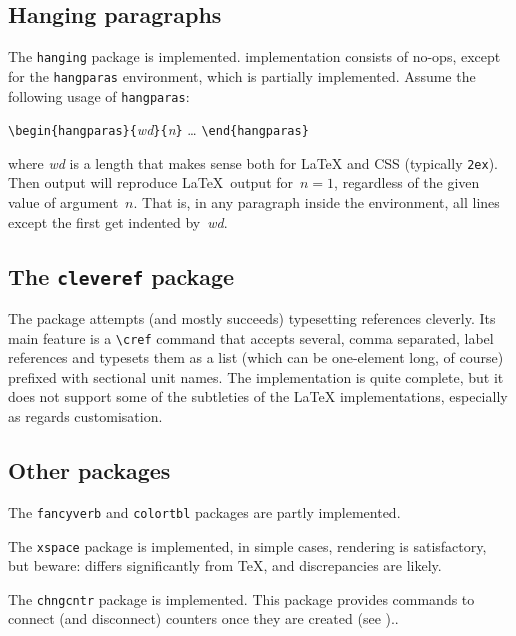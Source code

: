 \subsection{Hanging paragraphs}
%
The \texttt{hanging} package is implemented.
\hevea{} implementation consists of no-ops, except for the
\texttt{hangparas} environment, which is partially implemented.
Assume the following usage of \texttt{hangparas}:
\begin{flushleft}
\verb+\begin{hangparas}{+\textit{wd}\verb+}{+\textit{n}\verb+}+
\quad\ldots
\verb+\end{hangparas}+
\end{flushleft}
where \textit{wd} is a length that makes sense both for \LaTeX{}
and CSS (typically \texttt{2ex}).
Then \html{} output will reproduce \LaTeX~output for~$n=1$, regardless
of the given value of argument~$n$.
That is, in any paragraph inside the environment,
all lines except the first get indented by~\textit{wd}.


\subsection{The \texttt{cleveref} package}
%
The  package
attempts (and mostly succeeds) typesetting references
cleverly. Its main feature is a \verb+\cref+ command that accepts several,
comma separated, label references and typesets them as a list
(which can be one-element long, of course) prefixed with sectional unit names.
The \hevea{} implementation is quite complete, but it does not support some
of the subtleties of the \LaTeX{} implementations, especially as regards
customisation.


\subsection{Other packages}
The \texttt{fancyverb} and \texttt{colortbl}
packages are partly implemented.

The \texttt{xspace} package is implemented,
in simple cases, rendering is satisfactory, but beware: \hevea{}
differs significantly from \TeX{}, and discrepancies are likely.

The \texttt{chngcntr} package is implemented.
This package provides commands to connect (and disconnect) counters
once they are created\ifhevea{} (see
).\else.\fi

